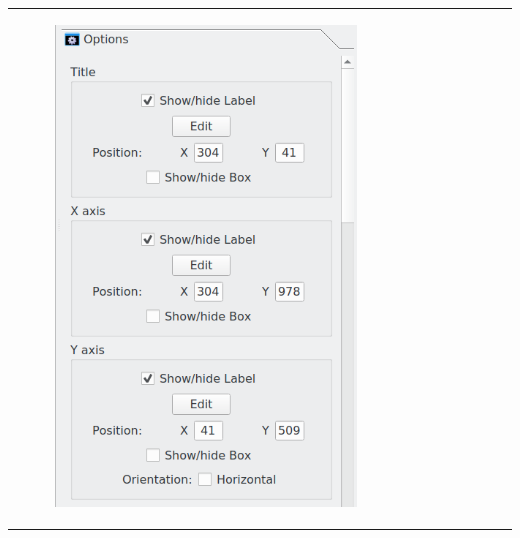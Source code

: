 \documentclass[10pt]{article}
\begin{document}

\begin{tabular}{lcr}
\begin{minipage}{.3\linewidth}
\hspace*{-3mm}
\begin{figure}[H]
\begin{center}
\vspace*{-12mm}
\includegraphics[width=.73\linewidth]{damqt320_2D_options_1.png}
\end{center}
\end{figure}
\end{minipage}
&
\begin{minipage}{.3\linewidth}
\hspace*{-3mm}
\begin{figure}[H]
\begin{center}
\vspace*{1mm}

\end{center}
\end{figure}
\end{minipage}
\end{tabular}
\end{document}
